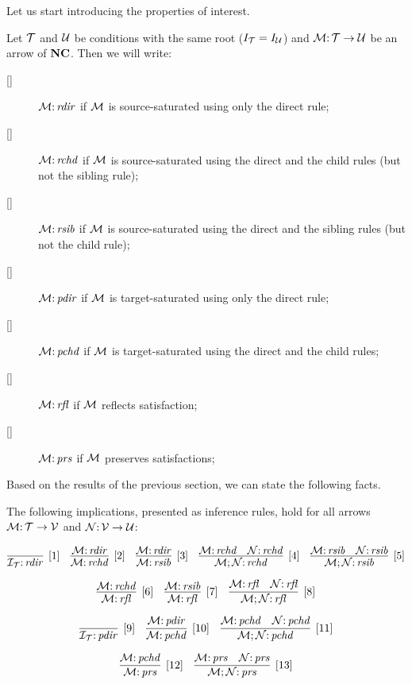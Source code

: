Let us start introducing the properties of interest.

\begin{definition}
\label{def:properties}
\end{definition}
Let ${\mathcal{T}}$ and ${\mathcal{U}}$ be conditions with the same root ($I_{\mathcal{T}}=I_{\mathcal{U}}$) and ${\mathcal{M}} {:}\, {\mathcal{T}} \rightarrow {\mathcal{U}}$ be an arrow of $\mathbf{NC}$. Then we will write:

\begin{description}
    \item[{[\rdir]}] ${\mathcal{M}} {:}\, \mathit{rdir}$ if ${\mathcal{M}}$ is source-saturated using only the  direct rule;
    \item [{[\rchd]}] ${\mathcal{M}} {:}\, \mathit{rchd}$ if ${\mathcal{M}}$ is source-saturated using the  direct and the child rules (but not the sibling rule);
    \item  [{[\rsib]}] ${\mathcal{M}} {:}\, \mathit{rsib}$ if ${\mathcal{M}}$ is source-saturated using the  direct and the sibling rules (but not the child rule);
    \item [{[\pdir]}] ${\mathcal{M}} {:}\, \mathit{pdir}$ if ${\mathcal{M}}$ is target-saturated using only the  direct rule;
    \item [{[\pchd]}] ${\mathcal{M}} {:}\, \mathit{pchd}$ if ${\mathcal{M}}$ is target-saturated using the  direct and the child rules;
    \item [{[\rfl]}] ${\mathcal{M}} {:}\, \mathit{rfl}$ if ${\mathcal{M}}$ reflects satisfaction;
    \item [{[\prs]}] ${\mathcal{M}} {:}\, \mathit{prs}$ if ${\mathcal{M}}$ preserves satisfactions;
\end{description}

Based on the results of the previous section, we can state the following facts.

\begin{proposition}
The following implications, presented as inference rules, hold for all arrows ${\mathcal{M}} {:}\,{\mathcal{T}} \rightarrow {\mathcal{V}}$ and ${\mathcal{N}}{:}\, {\mathcal{V}} \rightarrow {\mathcal{U}}$: 

$$\infer[{[1]}]{\cI_\cT \of \rdir}{} \quad \infer[{[2]}]{\cM\of \rchd}{\cM\of \rdir} \quad \infer[{[3]}]{\cM\of \rsib}{\cM\of \rdir} \quad \infer[{[4]}]{\cM;\cN\of \rchd}{\cM\of \rchd & \cN \of \rchd}  \quad \infer[{[5]}]{\cM;\cN\of \rsib}{\cM\of \rsib & \cN \of \rsib} $$

$$\infer[{[6]}]{\cM\of \rfl}{\cM\of \rchd} \quad \infer[{[7]}]{\cM\of \rfl}{\cM\of \rsib} \quad \infer[{[8]}]{\cM;\cN\of \rfl}{\cM\of \rfl & \cN \of \rfl} $$ 

$$\infer[{[9]}]{\cI_\cT \of \pdir}{} \quad \infer[{[10]}]{\cM\of \pchd}{\cM\of \pdir} \quad 
\infer[{[11]}]{\cM;\cN\of \pchd}{\cM\of \pchd & \cN \of \pchd}  $$

$$\infer[{[12]}]{\cM\of \prs}{\cM\of \pchd} \quad
\infer[{[13]}]{\cM;\cN\of \prs}{\cM\of \prs & \cN \of \prs} $$ 
\end{proposition} 

